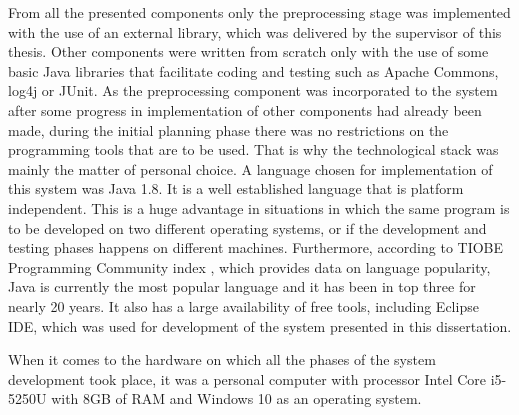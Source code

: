 From all the presented components only the preprocessing stage was implemented with the use of an external library, which was delivered by the supervisor of this thesis. Other components were written from scratch only with the use of some basic Java libraries that facilitate coding and testing such as Apache Commons, log4j or JUnit. As the preprocessing component was incorporated to the system after some progress in implementation of other components had already been made, during the initial planning phase there was no restrictions on the programming tools that are to be used. That is why the technological stack was mainly the matter of personal choice. A language chosen for implementation of this system was Java 1.8. It is a well established language that is platform independent. This is a huge advantage in situations in which the same program is to be developed on two different operating systems, or if the development and testing phases happens on different machines. Furthermore, according to TIOBE Programming Community index \cite{tiobe}, which provides data on language popularity, Java is currently the most popular language and it has been in top three for nearly 20 years. It also has a large availability of free tools, including Eclipse IDE, which was used for development of the system presented in this dissertation. 

When it comes to the hardware on which all the phases of the system development took place, it was a personal computer with processor Intel Core i5-5250U with 8GB of RAM and Windows 10 as an operating system.